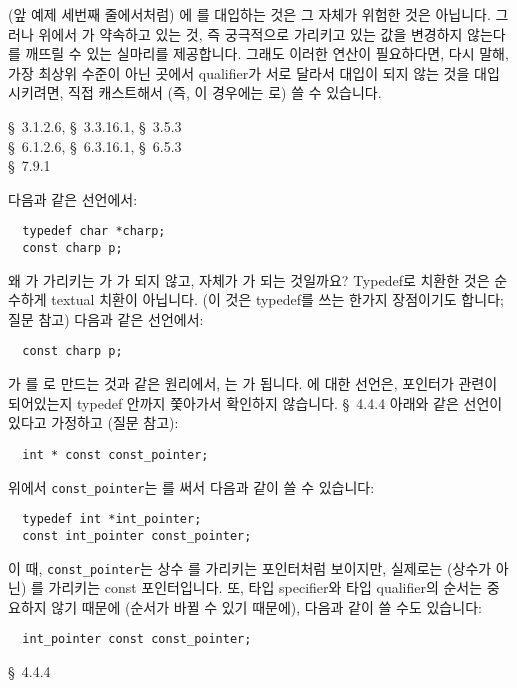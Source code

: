 \begin{faq}
        (앞 예제 세번째 줄에서처럼) 에 를
        대입하는 것은 그 자체가 위험한 것은 아닙니다. 그러나 위에서 가
        약속하고 있는 것, 즉 궁극적으로 가리키고 있는 값을 변경하지 않는다를
        깨뜨릴 수 있는 실마리를 제공합니다.  그래도 이러한 연산이 필요하다면,
        다시 말해, 가장 최상위 수준이 아닌 곳에서 qualifier가 서로 달라서
        대입이 되지 않는 것을 대입시키려면, 
        직접 캐스트해서 (즉, 이 경우에는 로) 쓸
        수 있습니다. 

\R
	\cite{ansi} \S\ 3.1.2.6, \S\ 3.3.16.1, \S\ 3.5.3 \\
	\cite{c89} \S\ 6.1.2.6, \S\ 6.3.16.1, \S\ 6.5.3 \\
	\cite{hs} \S\ 7.9.1 
\end{faq}

\begin{faq}
	다음과 같은 선언에서:
\begin{verbatim}
  typedef char *charp;
  const charp p;
\end{verbatim}
	왜 가 가리키는 가 가 되지 않고,  자체가
          가 되는 것일까요?
\A
	Typedef로 치환한 것은 순수하게 textual 치환이 아닙니다.
        (이 것은 typedef를 쓰는 한가지 장점이기도 합니다; 질문  참고)
        다음과 같은 선언에서:
\begin{verbatim}
  const charp p;
\end{verbatim}
	가 를 로 만드는 것과 같은 원리에서,
        는 가 됩니다. 에 대한 선언은, 포인터가 관련이
        되어있는지 typedef 안까지 쫓아가서 확인하지 않습니다.
\R
	\cite{hs} \S\ 4.4.4 
\T
	아래와 같은 선언이
        있다고 가정하고 (질문  참고):
\begin{verbatim}
  int * const const_pointer;
\end{verbatim}
	\noindent 위에서 \verb+const_pointer+는 를 써서 다음과
        같이 쓸 수 있습니다:
\begin{verbatim}
  typedef int *int_pointer;
  const int_pointer const_pointer;
\end{verbatim}
	\noindent 이 때, \verb+const_pointer+는 상수 를 가리키는
        포인터처럼 보이지만, 실제로는 (상수가 아닌) 를 가리키는
        const 포인터입니다. 또, 타입 specifier와 타입 qualifier의 순서는
        중요하지 않기 때문에 (순서가 바뀔 수 있기 때문에), 다음과 같이
        쓸 수도 있습니다:
\begin{verbatim}
  int_pointer const const_pointer;
\end{verbatim}

\R
	\cite{hs5} \S\ 4.4.4 
\end{faq}


